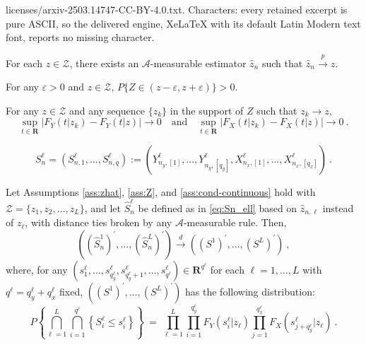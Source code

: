 \documentclass[10pt,a4paper]{amsart}
\begin{document}
licenses/arxiv-2503.14747-CC-BY-4.0.txt. Characters: every retained excerpt is pure ASCII, so the delivered engine, XeLaTeX with its default Latin Modern text font, reports no missing character.
\begin{assumption}\label{ass:zhat}
  For each $z\in\mathcal Z$, there exists an $\mathcal A$-measurable estimator $\hat z_n$ such that $\hat z_n \overset{p}{\to} z$.
  \end{assumption}

\begin{assumption}\label{ass:Z}
For any $\varepsilon >0$ and $z\in \mathcal{Z}$, $P\{Z\in (z-\varepsilon ,z+\varepsilon )\}>0$.
  \end{assumption}

\begin{assumption}\label{ass:cond-continuous}
    For any $z\in\mathcal Z$ and any sequence $\{z_k\}$ in the support of $Z$ such that $z_k\to z$,
    \[
    \sup_{t\in\mathbf R}\big|F_Y(t| z_k)-F_Y(t| z)\big|\to 0
    \quad\text{and}\quad
    \sup_{t\in\mathbf R}\big|F_X(t| z_k)-F_X(t| z)\big|\to 0~.
    \]
  \end{assumption}

\begin{equation}\label{eq:Sn_ell}
  S^{\ell}_n = (S^{\ell}_{n,1}, \dots, S^{\ell}_{n,q}) := (Y^{\ell}_{n_y,[1]}, \dots, Y^{\ell}_{n_y,[q_y]}, X^{\ell}_{n_x,[1]}, \dots, X^{\ell}_{n_x,[q_x]})~.
\end{equation}

\begin{theorem}\label{thm:limit-Sn-general}
  Let Assumptions \ref{ass:zhat}, \ref{ass:Z}, and \ref{ass:cond-continuous} hold with $\mathcal{Z}=\{z_{1},z_{2},\dots,z_{L}\}$, and let $\hat S^{\ell}_n$ be defined as in \eqref{eq:Sn_ell} based on $\hat z_{n,\ell}$ instead of $z_{\ell}$, with distance ties broken by any $\mathcal A$-measurable rule. Then,
  \begin{equation}
      (({\hat S_{n}^{1}})^{\prime},\ldots,({\hat S_{n}^{L}})^{\prime})\overset{d}{\rightarrow}
      (({S^{1}})^{\prime},\ldots,({S^{L}})^{\prime})~,
      \label{eq:limit_randomz_L0}
      \end{equation}
  where, for any $(s_{1}^{\ell},\dots,s_{q_y^\ell}^{\ell},s_{q_y^\ell+1}^{\ell},\dots,
  s_{q^\ell}^{\ell})\in\mathbf{R}^{q^\ell}$ for each $\ell=1,\dots,L$ with $q^\ell=q_y^\ell+q_x^\ell$ fixed, $(({S^{1}})^{\prime},\ldots,({S^{L}})^{\prime})$ has the following distribution:
  \begin{equation}
      P\left\{\bigcap_{\ell=1}^{L}\bigcap_{i=1}^{q^{\ell}}\left\{S_{i}^{\ell}\leq s_{i}^{\ell}
      \right\}\right\}~=~\prod_{\ell=1}^{L}\prod_{i=1}^{q_{y}^{\ell}}F_{Y}(s_{i}^{\ell}|z_{\ell})
      \prod_{j=1}^{q_{x}^{\ell}}F_{X}(s_{j+q_{y}^{\ell}}^{\ell}|z_{\ell})~.
      \label{eq:limit-Sn-general_limit_distribution}
  \end{equation}
  \end{theorem}
\end{document}
